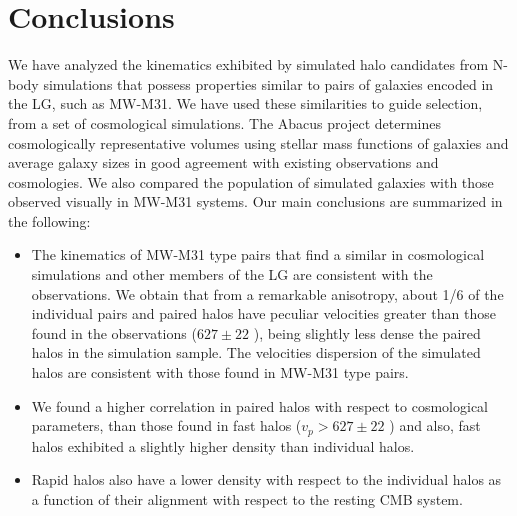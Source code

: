 \documentclass[usenatbib]{mnras}
\newcommand{\kms}{{\ifmmode{\ {\rm km\, {s}^{-1}}}\else{\ km s$^{-1}$}\fi}}
\begin{document}
\section{Conclusions}
We have analyzed the kinematics exhibited by simulated halo candidates from N-body simulations that possess properties similar to pairs of galaxies encoded in the LG, such as MW-M31. We have used these similarities to guide selection, from a set of cosmological simulations. The Abacus project determines cosmologically representative volumes using stellar mass functions of galaxies and average galaxy sizes in good agreement with existing observations and cosmologies.
We also compared the population of simulated galaxies with those observed visually in MW-M31 systems.
Our main conclusions are summarized in the following:
\begin{itemize}
\item The kinematics of MW-M31 type pairs that find a similar in cosmological simulations and other members of the LG are consistent with the observations. We obtain that from a remarkable anisotropy, about 1/6 of the individual pairs and paired halos have peculiar velocities greater than those found in the observations ($627 \pm 22$ \kms), being slightly less dense the paired halos in the simulation sample. The velocities dispersion of the simulated halos are consistent with those found in MW-M31 type pairs.
\item We found a higher correlation in paired halos with respect to cosmological parameters, than those found in fast halos ($v_p> 627 \pm 22$ \kms) and also, fast halos exhibited a slightly higher density than individual halos.
\item Rapid halos also have a lower density with respect to the individual halos as a function of their alignment with respect to the resting CMB system.
\end{itemize}



\end{document}
